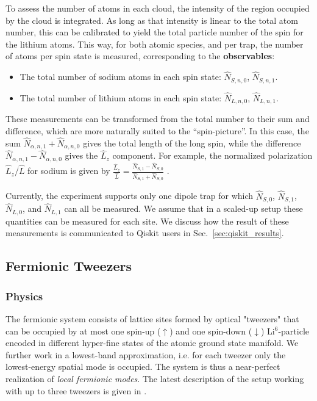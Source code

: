 \documentclass[a4paper, 10pt]{article}
\begin{document}
    To assess the number of atoms in each cloud, the intensity of the region occupied by the cloud is integrated.
    As long as that intensity is linear to the total atom number, this can be calibrated to yield the total particle number of the spin for the lithium atoms. 
    This way, for both atomic species, and per trap, the number of atoms per spin state is measured, corresponding to the \textbf{observables}:
        
        \begin{itemize}
            \item The total number of sodium atoms in each spin state: $\hat{N}_{S, n, 0}$, $\hat{N}_{S, n, 1}$.
            \item The total number of lithium atoms in each spin state: $\hat{N}_{L, n, 0}$, $\hat{N}_{L, n, 1}$.
        \end{itemize}
        
        These measurements can be transformed from the total number to their sum and difference, which are more naturally suited to the ``spin-picture''.
        In this case, the sum $\hat{N}_{\alpha, n, 1} + \hat{N}_{\alpha, n, 0}$ gives the total length of the long spin, while the difference $\hat{N}_{\alpha, n, 1} - \hat{N}_{\alpha, n, 0}$ gives the $\hat{L}_z$ component.
        For example, the normalized polarization $\hat{L}_z/\hat{L}$ for sodium is given by $\frac{\hat{L}_z}{\hat{L}} = \frac{\hat{N}_{S, 1} - \hat{N}_{S, 0}}{\hat{N}_{S, 1} + \hat{N}_{S, 0}}$ .
        
        Currently, the experiment supports only one dipole trap for which $\hat{N}_{S, 0}$, $\hat{N}_{S, 1}$, $\hat{N}_{L, 0}$, and $\hat{N}_{L, 1}$ can all be measured. We assume that in a scaled-up setup these quantities can be measured for each site. We discuss how the result of these measurements is communicated to Qiskit users in Sec.~\ref{sec:qiskit_results}. 
    
    
\newpage
    
    
    \subsection{Fermionic Tweezers}
        \subsubsection{Physics}

The fermionic system consists of lattice sites formed by optical "tweezers" that can be occupied by at most one spin-up ($\uparrow$) and one spin-down ($\downarrow$) Li$^6$-particle encoded in different hyper-fine states of the atomic ground state manifold.
We further work in a lowest-band approximation, i.e. for each tweezer only the lowest-energy spatial mode is occupied.
The system is thus a near-perfect realization of \emph{local fermionic modes}.
The latest description of the setup working with up to three tweezers is given in \cite{becher2020characterizing}. 
\end{document}

